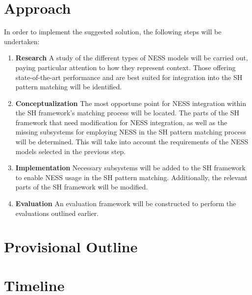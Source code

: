 \documentclass[11pt]{scrreprt}
\begin{document}
\section{Approach}
In order to implement the suggested solution, the following steps will be undertaken:

\begin{enumerate}
 	\item \textbf{Research}
	A study of the different types of NESS models will be carried out, paying particular attention to how they represent context. Those offering state-of-the-art performance and are best suited for integration into the SH pattern matching will be identified.
 	\item \textbf{Conceptualization}
 	The most opportune point for NESS integration within the SH framework's matching process will be located. The parts of the SH framework that need modification for NESS integration, as well as the missing subsystems for employing NESS in the SH pattern matching process will be determined. This will take into account the requirements of the NESS models selected in the previous step.
 	\item \textbf{Implementation}
	Necessary subsystems will be added to the SH framework to enable NESS usage in the SH pattern matching. Additionally, the relevant parts of the SH framework will be modified.
 	\item \textbf{Evaluation}
 	An evaluation framework will be constructed to perform the evaluations outlined earlier.
\end{enumerate}


\section{Provisional Outline}

\makeatletter

\makeatother


\section{Timeline}





\printbibliography[title={References}]
\end{document}
